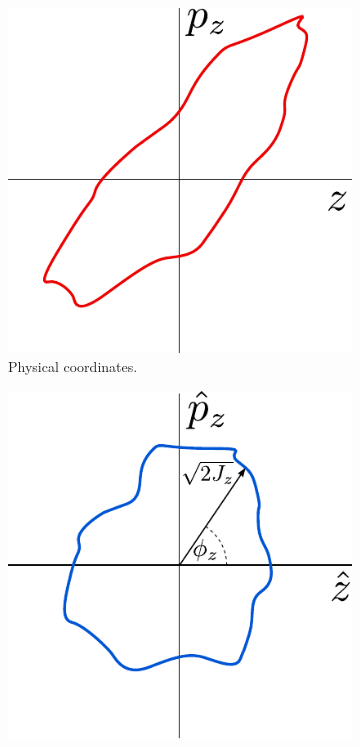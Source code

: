 \begin{figure}[!hbt]
    \centering
    \begin{subfigure}[b]{0.30\textwidth}
        \centering
        \includegraphics[width=\textwidth]{Figures/Beam_Dynamics_Theory/phase_space_nonlinear_physical.pdf}
        \caption{Physical coordinates.}
        \label{fig:phase_space_physical_non-linear}
    \end{subfigure}
    \hfill
    \begin{subfigure}[b]{0.30\textwidth}
        \centering
        \includegraphics[width=\textwidth]{Figures/Beam_Dynamics_Theory/phase_space_nonlinear_normalized.pdf}

\end{subfigure}
\end{figure}

